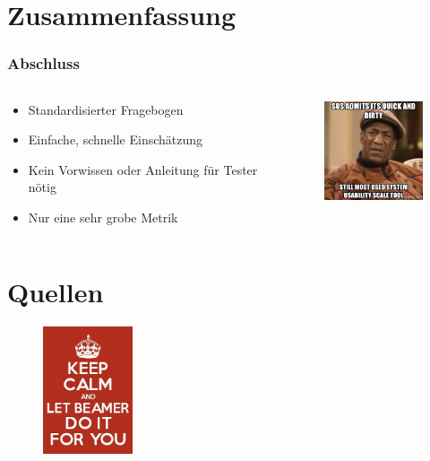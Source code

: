 \documentclass[12pt, aspectratio=169]{beamer}
\begin{document}
\section{Zusammenfassung}
\begin{frame}
	\frametitle{Abschluss}
	\begin{columns}
		\begin{column}{0.5\textwidth}
			\begin{itemize}
				\item <1> Standardisierter Fragebogen
				\item <1> Einfache, schnelle Einschätzung
				\item <1> Kein Vorwissen oder Anleitung für Tester nötig
				\item <1> Nur eine sehr grobe Metrik
			\end{itemize}
		\end{column}
		\begin{column}{0.5\textwidth}
			\begin{figure}
				\centering
				\includegraphics[keepaspectratio=true, width=125px]{./image/sus-meme.png}
				\caption{\tiny{\cite{sp1}}}
			\end{figure}
		\end{column}
	\end{columns}
\end{frame}

\section{Quellen}
\begin{frame}
    \nocite{*}
	\hfill
	\begin{figure}
		\includegraphics[keepaspectratio=true, width=100px]{./image/J3Nae.png}
	\end{figure}
    
    
\end{frame}
\end{document}
